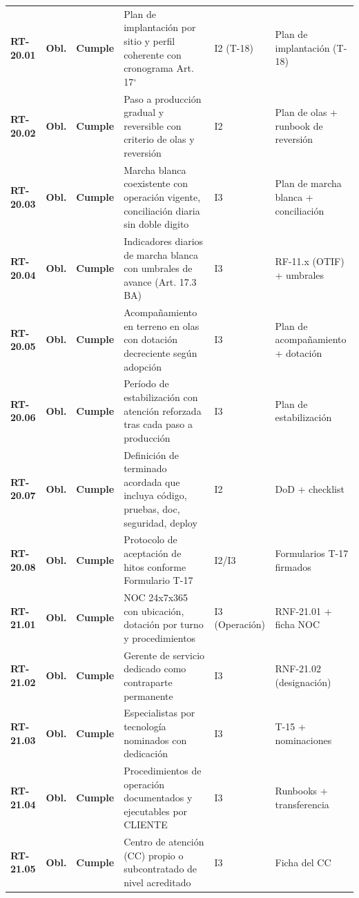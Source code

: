 \begin{small}
\begin{longtable}{@{}p{1.35cm} p{1.15cm} p{1.15cm} p{4.6cm} p{2.35cm} p{3.8cm}@{}}
\textbf{RT-20.01} & \textbf{Obl.} & \textbf{Cumple} & Plan de implantaci\'on por sitio y perfil coherente con cronograma Art. 17$^{\circ}$ & I2 (T-18) & Plan de implantaci\'on (T-18) \\
\textbf{RT-20.02} & \textbf{Obl.} & \textbf{Cumple} & Paso a producci\'on gradual y reversible con criterio de olas y reversi\'on & I2 & Plan de olas + runbook de reversi\'on \\
\textbf{RT-20.03} & \textbf{Obl.} & \textbf{Cumple} & Marcha blanca coexistente con operaci\'on vigente, conciliaci\'on diaria sin doble digito & I3 & Plan de marcha blanca + conciliaci\'on \\
\textbf{RT-20.04} & \textbf{Obl.} & \textbf{Cumple} & Indicadores diarios de marcha blanca con umbrales de avance (Art. 17.3 BA) & I3 & RF-11.x (OTIF) + umbrales \\
\textbf{RT-20.05} & \textbf{Obl.} & \textbf{Cumple} & Acompa\~namiento en terreno en olas con dotaci\'on decreciente seg\'un adopci\'on & I3 & Plan de acompa\~namiento + dotaci\'on \\
\textbf{RT-20.06} & \textbf{Obl.} & \textbf{Cumple} & Per\'iodo de estabilizaci\'on con atenci\'on reforzada tras cada paso a producci\'on & I3 & Plan de estabilizaci\'on \\
\textbf{RT-20.07} & \textbf{Obl.} & \textbf{Cumple} & Definici\'on de terminado acordada que incluya c\'odigo, pruebas, doc, seguridad, deploy & I2 & DoD + checklist \\
\textbf{RT-20.08} & \textbf{Obl.} & \textbf{Cumple} & Protocolo de aceptaci\'on de hitos conforme Formulario T-17 & I2/I3 & Formularios T-17 firmados \\
\textbf{RT-21.01} & \textbf{Obl.} & \textbf{Cumple} & NOC 24x7x365 con ubicaci\'on, dotaci\'on por turno y procedimientos & I3 (Operaci\'on) & RNF-21.01 + ficha NOC \\
\textbf{RT-21.02} & \textbf{Obl.} & \textbf{Cumple} & Gerente de servicio dedicado como contraparte permanente & I3 & RNF-21.02 (designaci\'on) \\
\textbf{RT-21.03} & \textbf{Obl.} & \textbf{Cumple} & Especialistas por tecnolog\'ia nominados con dedicaci\'on & I3 & T-15 + nominaciones \\
\textbf{RT-21.04} & \textbf{Obl.} & \textbf{Cumple} & Procedimientos de operaci\'on documentados y ejecutables por CLIENTE & I3 & Runbooks + transferencia \\
\textbf{RT-21.05} & \textbf{Obl.} & \textbf{Cumple} & Centro de atenci\'on (CC) propio o subcontratado de nivel acreditado & I3 & Ficha del CC \\

\end{longtable}
\end{small}

